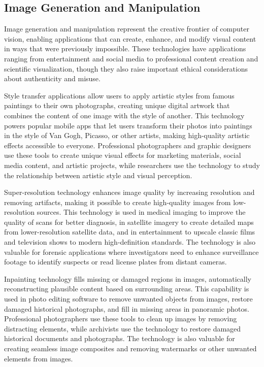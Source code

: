 \subsection{Image Generation and Manipulation}

Image generation and manipulation represent the creative frontier of computer vision, enabling applications that can create, enhance, and modify visual content in ways that were previously impossible. These technologies have applications ranging from entertainment and social media to professional content creation and scientific visualization, though they also raise important ethical considerations about authenticity and misuse.

Style transfer applications allow users to apply artistic styles from famous paintings to their own photographs, creating unique digital artwork that combines the content of one image with the style of another. This technology powers popular mobile apps that let users transform their photos into paintings in the style of Van Gogh, Picasso, or other artists, making high-quality artistic effects accessible to everyone. Professional photographers and graphic designers use these tools to create unique visual effects for marketing materials, social media content, and artistic projects, while researchers use the technology to study the relationship between artistic style and visual perception.

Super-resolution technology enhances image quality by increasing resolution and removing artifacts, making it possible to create high-quality images from low-resolution sources. This technology is used in medical imaging to improve the quality of scans for better diagnosis, in satellite imagery to create detailed maps from lower-resolution satellite data, and in entertainment to upscale classic films and television shows to modern high-definition standards. The technology is also valuable for forensic applications where investigators need to enhance surveillance footage to identify suspects or read license plates from distant cameras.

Inpainting technology fills missing or damaged regions in images, automatically reconstructing plausible content based on surrounding areas. This capability is used in photo editing software to remove unwanted objects from images, restore damaged historical photographs, and fill in missing areas in panoramic photos. Professional photographers use these tools to clean up images by removing distracting elements, while archivists use the technology to restore damaged historical documents and photographs. The technology is also valuable for creating seamless image composites and removing watermarks or other unwanted elements from images.

